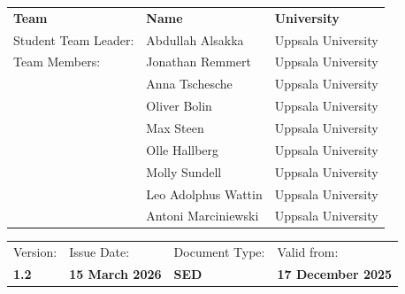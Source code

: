 \documentclass[ %
  a4paper, %
  11pt, %
  openany, %
  parskip, %
  toc=totoc, %
  listof=totoc, %
  bibliography=totoc %
]{scrreprt} %
\providecommand{\DIFaddbegin}{} %
\providecommand{\DIFaddend}{} %
\providecommand{\DIFdelbegin}{} %
\providecommand{\DIFdelend}{} %
\providecommand{\DIFscaledelfig}{0.5}
\newlength{\DIFdelgraphicswidth} %
\newlength{\DIFdelgraphicsheight} %
\providecommand{\DIFaddincludegraphics}[2][]{{\color{blue}\fbox{\DIFOincludegraphics[#1]{#2}}}} %
\providecommand{\DIFdelincludegraphics}[2][]{%
\sbox{\DIFdelgraphicsbox}{\DIFOincludegraphics[#1]{#2}}%
\settoboxwidth{\DIFdelgraphicswidth}{\DIFdelgraphicsbox} %
\settoboxtotalheight{\DIFdelgraphicsheight}{\DIFdelgraphicsbox} %
\scalebox{\DIFscaledelfig}{%
\parbox[b]{\DIFdelgraphicswidth}{\usebox{\DIFdelgraphicsbox}\\[-\baselineskip] \rule{\DIFdelgraphicswidth}{0em}}\llap{\resizebox{\DIFdelgraphicswidth}{\DIFdelgraphicsheight}{%
\setlength{\unitlength}{\DIFdelgraphicswidth}%
\begin{picture}(1,1)%
\thicklines\linethickness{2pt} %
{\color[rgb]{1,0,0}\put(0,0){\framebox(1,1){}}}%
{\color[rgb]{1,0,0}\put(0,0){\line( 1,1){1}}}%
{\color[rgb]{1,0,0}\put(0,1){\line(1,-1){1}}}%
\end{picture}%
}\hspace*{3pt}}} %
} %
\DeclareRobustCommand{\DIFaddbegin}{\DIFOaddbegin \let\includegraphics\DIFaddincludegraphics} %
\DeclareRobustCommand{\DIFaddend}{\DIFOaddend \let\includegraphics\DIFOincludegraphics} %
\DeclareRobustCommand{\DIFdelbegin}{\DIFOdelbegin \let\includegraphics\DIFdelincludegraphics} %
\DeclareRobustCommand{\DIFdelend}{\DIFOaddend \let\includegraphics\DIFOincludegraphics} %
\begin{document}
\begin{titlepage}
\DIFdelbegin %
\DIFdelend \DIFaddbegin \begin{tabular}{l l l}
  \textbf{Team}        & \textbf{Name} & \textbf{University}\\
  Student Team Leader: & Abdullah Alsakka & Uppsala University \\
  Team Members: & Jonathan Remmert & Uppsala University \\
    & Anna Tschesche & Uppsala University \\
    & Oliver Bolin & Uppsala University\\
    & Max Steen & Uppsala University \\
    & Olle Hallberg & Uppsala University \\
    & Molly Sundell & Uppsala University \\
    & Leo Adolphus Wattin & Uppsala University \\
    & Antoni Marciniewski & Uppsala University \\   
\end{tabular}\DIFaddend 

\DIFdelbegin %
\DIFdelend \DIFaddbegin \enlargethispage{3cm}
\DIFaddend 

\DIFdelbegin %
\DIFdelend \DIFaddbegin \begin{tabular}{llll}
  Version:        & Issue Date:               & Document Type: & Valid from: \\
  \textbf{1.2}      & \textbf{15 March 2026}    & \textbf{SED}  & \textbf{17 December 2025}
\end{tabular}\DIFaddend 


\end{titlepage}
\end{document}
